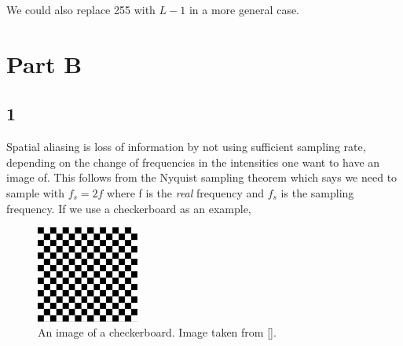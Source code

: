 {We could also replace 255 with $L-1$ in a more general case.


\section{Part B}
\subsection{1}
Spatial aliasing is loss of information by not using sufficient sampling rate, depending on the change of frequencies in the intensities one want to have an image of. This follows from the Nyquist sampling theorem which says we need to sample with $f_{s} = 2f$ where f is the \emph{real} frequency and $f_{s}$ is the sampling frequency. If we use a checkerboard as an example,

\begin{figure}[!htb]
{\centering
    \includegraphics[width=0.30\textwidth]{checker1.png}
    \caption{An image of a checkerboard. Image taken from [\cite{dip}].}
    \label{checker1}
\par}
\end{figure}



}
